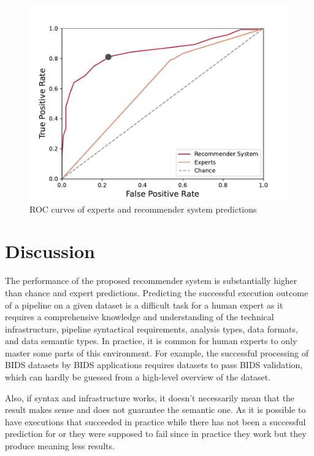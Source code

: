 \documentclass[conference]{IEEEtran}
\begin{document}
\begin{figure}
\centering
  \includegraphics[width=\columnwidth]{figures/ROC Curve.pdf}
  \caption{ROC curves of experts and recommender system predictions}
  \label{fig:roc-curve}
\end{figure}

\section{Discussion}

The performance of the proposed recommender system is substantially higher
than chance and expert predictions. Predicting the successful execution
outcome of a pipeline on a given dataset is a difficult task for a human
expert as it requires a comprehensive knowledge and understanding of the
technical infrastructure, pipeline syntactical requirements, analysis
types, data formats, and data semantic types. In practice, it is common for
human experts to only master some parts of this environment. For example,
the successful processing of BIDS datasets by BIDS applications requires
datasets to pass BIDS validation, which can hardly be guessed from a
high-level overview of the dataset. 

Also, if syntax and infrastructure works, it doesn’t necessarily mean that the result makes sense and does not guarantee the semantic one. As it is possible to have executions that succeeded in practice while there has not been a successful prediction for or they were supposed to fail since in practice they work but they produce meaning less results. 
\end{document}
